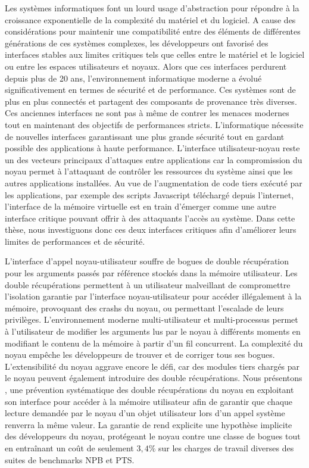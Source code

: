 Les systèmes informatiques font un lourd usage d'abstraction pour répondre à la croissance exponentielle de la complexité du matériel et du logiciel. 
A cause des considérations pour maintenir une compatibilité entre des éléments de différentes générations de ces systèmes complexes, les développeurs ont favorisé des interfaces stables aux limites critiques tels que celles entre le matériel et le logiciel ou entre les espaces utilisateurs et noyaux. 
Alors que ces interfaces perdurent depuis plus de 20 ans, l'environnement informatique moderne a évolué significativement en termes de sécurité et de performance. 
Ces systèmes sont de plus en plus connectés et partagent des composants de provenance  très diverses. 
Ces anciennes interfaces ne sont pas à même de contrer les menaces modernes tout en maintenant des objectifs de performances stricts. 
L'informatique nécessite de nouvelles interfaces garantissant une plus grande sécurité tout en gardant possible des applications à haute performance. 
L'interface utilisateur-noyau reste un des vecteurs principaux d'attaques entre applications car la compromission du noyau permet à l'attaquant de contrôler les ressources du système ainsi que les autres applications installées. 
Au vue de l'augmentation de code tiers exécuté par les applications, par exemple des scripts Javascript téléchargé depuis l'internet, l'interface de la mémoire virtuelle est en train d'émerger comme une autre interface critique pouvant offrir à des attaquants l'accès au système. 
Dans cette thèse, nous investiguons donc ces deux interfaces critiques afin d'améliorer leurs limites de performances et de sécurité.

L’interface d'appel noyau-utilisateur souffre de bogues de double récupération pour les arguments passés par référence stockés dans la mémoire utilisateur. 
Les double récupérations permettent à un utilisateur malveillant de compromettre l'isolation garantie par l'interface noyau-utilisateur pour accéder illégalement à la mémoire, provoquant des crashs du noyau, ou permettant l’escalade de leurs privilèges. 
L'environnement moderne multi-utilisateur et multi-processus permet à l'utilisateur de modifier les arguments lus par le noyau à différents moments en modifiant le contenu de la mémoire à partir d'un fil concurrent. 
La complexité du noyau empêche les développeurs de trouver et de corriger tous ses bogues. 
L'extensibilité du noyau aggrave encore le défi, car des modules tiers chargés par le noyau peuvent également introduire des double récupérations. 
Nous présentons \midas, une prévention systématique des double récupérations du noyau en exploitant son interface pour accéder à la mémoire utilisateur afin de garantir que chaque lecture demandée par le noyau d'un objet utilisateur lors d'un appel système renverra la même valeur. La garantie de \midas rend explicite une hypothèse implicite des développeurs du noyau, protégeant le noyau contre une classe de bogues tout en entraînant un coût de seulement $3,4\%$ sur les charges de travail diverses des suites de benchmarks NPB et PTS.

